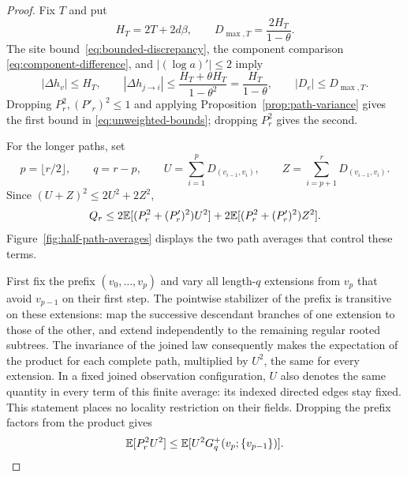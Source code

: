 \begin{proof}
Fix $T$ and put
\[
 H_T=2T+2d\beta,\qquad
 D_{\max,T}=\frac{2H_T}{1-\theta}.
\]
The site bound~\eqref{eq:bounded-discrepancy}, the component comparison
\eqref{eq:component-difference}, and $|(\log a)'|\le2$ imply
\begin{equation}
 |\Delta h_v|\le H_T,\qquad
 |\Delta h_{j\to i}|
       \le\frac{H_T+\theta H_T}{1-\theta^2}
       =\frac{H_T}{1-\theta},\qquad
 |D_e|\le D_{\max,T}.
 \label{eq:path-discrepancy-bound}
\end{equation}
Dropping $P_r^2,(P'_r)^2\le1$ and applying
Proposition~\ref{prop:path-variance} gives the first bound in
\eqref{eq:unweighted-bounds}; dropping $P_r^2$ gives the second.

For the longer paths, set
\[
 p=\lfloor r/2\rfloor,\qquad q=r-p,\qquad
 U=\sum_{i=1}^pD_{(v_{i-1},v_i)},\qquad
 Z=\sum_{i=p+1}^rD_{(v_{i-1},v_i)}.
\]
Since $(U+Z)^2\le2U^2+2Z^2$,
\begin{equation}
 Q_r\le2\mathbb E[(P_r^2+(P'_r)^2)U^2]
       +2\mathbb E[(P_r^2+(P'_r)^2)Z^2].
 \label{eq:path-half-split}
\end{equation}
Figure~\ref{fig:half-path-averages} displays the two path averages
that control these terms.

First fix the prefix $(v_0,\ldots,v_p)$ and vary all length-$q$
extensions from $v_p$ that avoid $v_{p-1}$ on their first step.
The pointwise stabilizer of the prefix is transitive on these
extensions: map the successive descendant branches of one extension
to those of the other, and extend independently to the remaining
regular rooted subtrees.  The invariance of the joined law consequently makes
the expectation of the product for each complete path, multiplied
by $U^2$, the same for every extension.  In a fixed joined observation
configuration, $U$ also denotes the same quantity in every term of
this finite average: its indexed directed edges stay fixed.  This
statement places no locality restriction on their fields.  Dropping
the prefix factors from the product gives
\begin{equation}
 \mathbb E[P_r^2U^2]
       \le\mathbb E[U^2G_q^+(v_p;\{v_{p-1}\})].
 \label{eq:prefix-extension-average}
\end{equation}


\end{proof}
